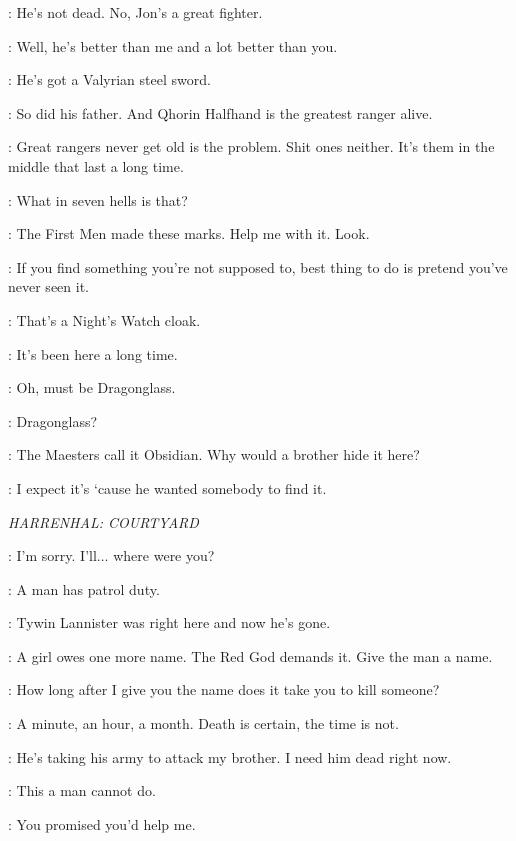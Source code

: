 \SAM: He's not dead. No, Jon's a great fighter. 

\GRENN: Well, he's better than me and a lot better than you. 

\SAM: He's got a Valyrian steel sword. 

\GRENN: So did his father. And Qhorin Halfhand is the greatest ranger alive. 

\EDD: Great rangers never get old is the problem. Shit ones neither. It's them in the middle that last a long time. 


\GRENN: What in seven hells is that? 


\SAM: The First Men made these marks. Help me with it.  Look. 

\GRENN: If you find something you're not supposed to, best thing to do is pretend you've never seen it. 

\SAM: That's a Night's Watch cloak. 

\GRENN: It's been here a long time. 

\SAM: Oh, must be Dragonglass. 

\GRENN: Dragonglass? 

\SAM: The Maesters call it Obsidian. Why would a brother hide it here? 

\EDD: I expect it's `cause he wanted somebody to find it. 


\scene

\textit{HARRENHAL: COURTYARD} 


\ARYA: I'm sorry. I'll$\ldots$ where were you? 

\JAQEN: A man has patrol duty. 

\ARYA: Tywin Lannister was right here and now he's gone. 

\JAQEN: A girl owes one more name. The Red God demands it. Give the man a name. 

\ARYA: How long after I give you the name does it take you to kill someone? 

\JAQEN: A minute, an hour, a month. Death is certain, the time is not. 

\ARYA: He's taking his army to attack my brother. I need him dead right now. 

\JAQEN: This a man cannot do. 

\ARYA: You promised you'd help me. 

